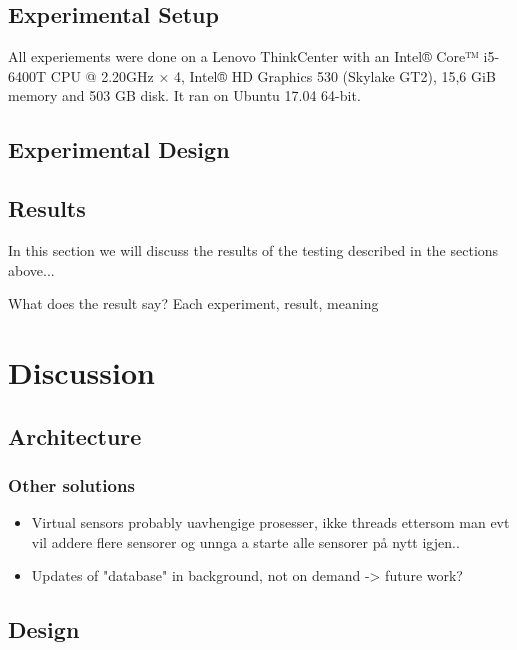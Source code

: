 \documentclass[USenglish]{uit-thesis}
\begin{document}
\section{Experimental Setup}
All experiements were done on a Lenovo ThinkCenter with an Intel® Core™ i5-6400T CPU @ 2.20GHz × 4, Intel® HD Graphics 530 (Skylake GT2), 15,6 GiB memory and 503 GB disk. It ran on Ubuntu 17.04 64-bit.

\section{Experimental Design}
\section{Results}
In this section we will discuss the results of the testing described in the sections above...

What does the result say?
Each experiment, result, meaning


\chapter{Discussion}

\section{Architecture}
\subsection{Other solutions}
\begin{itemize}
\item Virtual sensors probably uavhengige prosesser, ikke threads ettersom man evt vil addere flere sensorer og unnga a starte alle sensorer på nytt igjen..
\item Updates of "database" in background, not on demand -> future work?
\end{itemize}

\section{Design}
\end{document}
